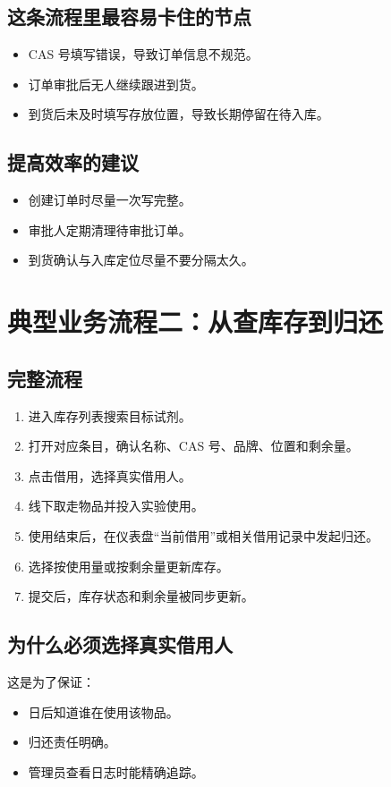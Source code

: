 \documentclass[12pt,a4paper]{ctexart}
\begin{document}
\subsection{这条流程里最容易卡住的节点}
\begin{itemize}
  \item CAS 号填写错误，导致订单信息不规范。
  \item 订单审批后无人继续跟进到货。
  \item 到货后未及时填写存放位置，导致长期停留在待入库。
\end{itemize}

\subsection{提高效率的建议}
\begin{itemize}
  \item 创建订单时尽量一次写完整。
  \item 审批人定期清理待审批订单。
  \item 到货确认与入库定位尽量不要分隔太久。
\end{itemize}

\newpage
\section{典型业务流程二：从查库存到归还}

\subsection{完整流程}
\begin{enumerate}
  \item 进入库存列表搜索目标试剂。
  \item 打开对应条目，确认名称、CAS 号、品牌、位置和剩余量。
  \item 点击借用，选择真实借用人。
  \item 线下取走物品并投入实验使用。
  \item 使用结束后，在仪表盘“当前借用”或相关借用记录中发起归还。
  \item 选择按使用量或按剩余量更新库存。
  \item 提交后，库存状态和剩余量被同步更新。
\end{enumerate}

\subsection{为什么必须选择真实借用人}
这是为了保证：
\begin{itemize}
  \item 日后知道谁在使用该物品。
  \item 归还责任明确。
  \item 管理员查看日志时能精确追踪。
\end{itemize}
\end{document}
